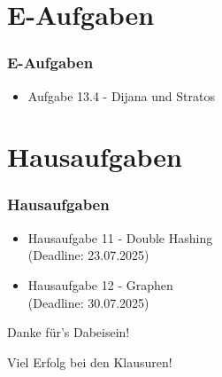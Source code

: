 \documentclass{beamer}
\begin{document}
\section{E-Aufgaben}
\begin{frame}
	\frametitle{E-Aufgaben}
	\begin{itemize}
		\item Aufgabe 13.4 - Dijana und Stratos
	\end{itemize}
\end{frame}

\section{Hausaufgaben}
\begin{frame}
	\frametitle{Hausaufgaben}
	\begin{itemize}
		\item Hausaufgabe 11 - Double Hashing \\
		      (Deadline: 23.07.2025)
		\item Hausaufgabe 12 - Graphen \\
		      (Deadline: 30.07.2025)
	\end{itemize}
\end{frame}

\begin{frame}{\null}
	\huge
	\begin{center}
		Danke für's Dabeisein!
	\end{center}
\end{frame}

\begin{frame}{\null}
	\huge
	\begin{center}
		Viel Erfolg bei den Klausuren!
	\end{center}
\end{frame}

\end{document}
